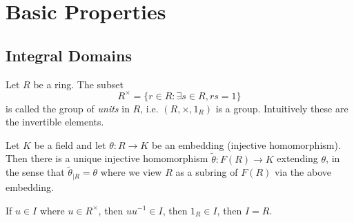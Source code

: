 \chapter{Basic Properties}
\section{Integral Domains}
\begin{definition}
    Let $R$ be a ring. The subset
    \[
    R^{\times} = \{r \in  R : \exists s \in  R, rs = 1\} 
    \] 
    is called the group of \textit{units} in $R$, i.e. $(R, \times, 1_R)$ is a group. 
    Intuitively these are the invertible elements.
\end{definition}
\begin{prop}
    Let $K$ be a field and let $\theta: R \to K$ be an embedding (injective homomorphism). Then there is a unique injective homomorphism $\tilde \theta :  F(R) \to  K$ extending $\theta$, in the sense that $\tilde \theta_{|R} = \theta$ where we view $R$ as a subring of $F(R)$ via the above embedding.
    
\end{prop}
\begin{remark}
    If $u \in  I$ where $u \in  R^\times$, then  $uu^{-1} \in  I$, then $1_R \in  I$, then $I = R$. 
\end{remark}
